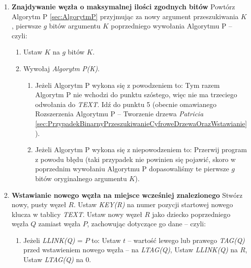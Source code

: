 \begin{enumerate}
		\item \textbf{Znajdywanie węzła o maksymalnej ilości zgodnych bitów} \newline
		Powtórz Algorytm P \ref{sec:AlgorytmP} przyjmując za nowy argument przeszukiwania $K$, pierwsze $g$ bitów argumentu $K$ poprzedniego wywołania Algorytmu P -- czyli: 
		\begin{enumerate}
			\item Ustaw $K$ na $g$ bitów $K$.
			\item Wywołaj \emph{Algorytm P(K)}.
			\begin{enumerate}
				\item Jeżeli Algorytm P wykona się z powodzeniem to: \newline
				Tym razem Algorytm P nie wchodzi do punktu szóstego, więc nie ma trzeciego odwołania do \emph{TEXT}. \newline
				Idź do punktu 5 (obecnie omawianego Rozszerzenia Algorytmu P -- Tworzenie drzewa \emph{Patricia} \ref{sec:PrzypadekBinarnyPrzeszukiwanieCyfroweDrzewaOrazWstawianie}).
				
				\item Jeżeli Algorytm P wykona się z niepowodzeniem to: \newline
				Przerwij program z powodu błędu (taki przypadek nie powinien się pojawić, skoro w poprzednim wywołaniu Algorytmu P dopasowaliśmy te pierwsze $g$ bitów oryginalnego argumentu $K$).
			\end{enumerate}
		\end{enumerate}
		
		\item \textbf{Wstawianie nowego węzła na miejsce wcześniej znalezionego} \newline
		Stwórz nowy, pusty węzeł $R$. \newline
		Ustaw \emph{KEY(R)} na numer pozycji startowej nowego klucza w tablicy \emph{TEXT}. \newline
		Ustaw nowy węzeł $R$ jako dziecko poprzedniego węzła $Q$ zamiast węzła $P$, zachowując dotyczące go dane -- czyli:
		\begin{enumerate}
			\item Jeżeli \emph{LLINK(Q)} = $P$ to: \newline
			Ustaw $t$ -- wartość lewego lub prawego \emph{TAG(Q)} przed wstawieniem nowego węzła -- na \emph{LTAG(Q)}, \newline
			Ustaw \emph{LLINK(Q)} na $R$, \newline
			Ustaw \emph{LTAG(Q)} na $0$.
			

\end{enumerate}
\end{enumerate}
